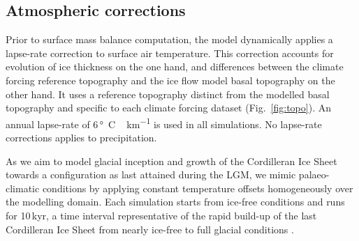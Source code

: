 
\subsection{Atmospheric corrections}

Prior to surface mass balance computation, the model dynamically applies a lapse-rate correction to surface air temperature. This correction accounts for evolution of ice thickness on the one hand, and differences between the climate forcing reference topography and the ice flow model basal topography on the other hand. It uses a reference topography distinct from the modelled basal topography and specific to each climate forcing dataset (Fig.~\ref{fig:topo}). An annual lapse-rate of 6\,\unit{\degree C\,km^{-1}} is used in all simulations. No lapse-rate corrections applies to precipitation.

As we aim to model glacial inception and growth of the Cordilleran Ice Sheet towards a configuration as last attained during the LGM, we mimic palaeo-climatic conditions by applying constant temperature offsets homogeneously over the modelling domain. Each simulation starts from ice-free conditions and runs for 10\,kyr, a time interval representative of the rapid build-up of the last Cordilleran Ice Sheet from nearly ice-free to full glacial conditions \citep{clague-1989,stroeven-etal-2010}.
